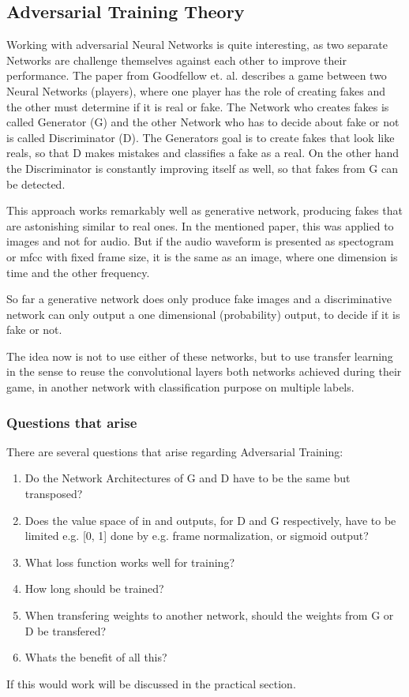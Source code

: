 \subsection{Adversarial Training Theory}\label{sec:adv_theory}
Working with adversarial Neural Networks is quite interesting, as two separate Networks are challenge themselves against each other to improve their performance.
The paper from Goodfellow et. al. \cite{goodfellow2014} describes a game between two Neural Networks (players), where one player has the role of creating fakes and the other must determine if it is real or fake.
The Network who creates fakes is called Generator (G) and the other Network who has to decide about fake or not is called Discriminator (D).
The Generators goal is to create fakes that look like reals, so that D makes mistakes and classifies a fake as a real.
On the other hand the Discriminator is constantly improving itself as well, so that fakes from G can be detected.

This approach works remarkably well as generative network, producing fakes that are astonishing similar to real ones.
In the mentioned paper, this was applied to images and not for audio.
But if the audio waveform is presented as spectogram or mfcc with fixed frame size, it is the same as an image,
where one dimension is time and the other frequency.

So far a generative network does only produce fake images and a discriminative network can only output a one dimensional (probability) output, to decide if it is fake or not.

The idea now is not to use either of these networks, but to use transfer learning in the sense to reuse the convolutional layers both networks achieved during their game, in another network with classification purpose on multiple labels.

\subsubsection{Questions that arise}
There are several questions that arise regarding Adversarial Training:
\begin{enumerate}[label={Q.\textgoth{A}.\arabic*)}, leftmargin=1.4cm]
  \item Do the Network Architectures of G and D have to be the same but transposed?
  \item Does the value space of in and outputs, for D and G respectively, have to be limited e.g. [0, 1] done by e.g. frame normalization, or sigmoid output?
  \item What loss function works well for training?
  \item How long should be trained?
  \item When transfering weights to another network, should the weights from G or D be transfered?
  \item Whats the benefit of all this?
\end{enumerate}

If this would work will be discussed in the practical section.



